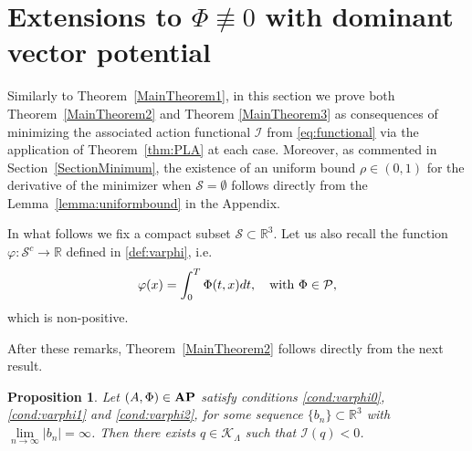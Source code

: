 \documentclass{article}
\newcommand{\boK}{\mathcal{K}}
\newcommand{\boI}{\mathcal{I}}
\newcommand{\R}{\mathbb{R}}
\newcommand{\boP}{\mathcal{P}}
\newcommand{\boS}{\mathcal{S}}
\newcommand{\AP}{\textnormal{\textbf{AP}}}
\newtheorem{proposition}{Proposition}[section]
\theoremstyle{definition}
\begin{document}
\section{Extensions to \texorpdfstring{$\Phi\not\equiv 0$}{} with dominant vector potential}\label{Section-Phi}
Similarly to Theorem~\ref{MainTheorem1}, in this section we prove both Theorem~\ref{MainTheorem2} and Theorem \ref{MainTheorem3} as consequences of minimizing the associated action functional $\boI$ from \eqref{eq:functional} via the application of Theorem~\ref{thm:PLA} at each case. Moreover, as commented in Section~\ref{SectionMinimum}, the existence of an uniform bound $\rho\in(0,1)$ for the derivative of the minimizer when $\boS=\emptyset$ follows directly from the Lemma~\ref{lemma:uniformbound} in the Appendix.

In what follows we fix a compact subset $\boS\subset\R^3$. Let us also recall the function $\varphi:\boS^c\to\R$ defined in \eqref{def:varphi}, i.e.
\begin{equation}
    \varphi(x)=\int_0^T\Phi(t,x)dt,\quad\hbox{with }\Phi\in\boP,
\end{equation}
which is non-positive. 

After these remarks, Theorem~\ref{MainTheorem2} follows directly from the next result.
\begin{proposition}\label{MainTheorem2'}
    Let $(A,\Phi)\in\AP$ satisfy conditions \eqref{cond:varphi0}, \eqref{cond:varphi1} and \eqref{cond:varphi2}, for some sequence $\{b_n\}\subset\R^3$ with $\lim\limits_{n\to\infty}|b_n|=\infty$. Then there exists $q\in\boK_\Lambda$ such that $\boI(q)<0$.
\end{proposition}
\end{document}
